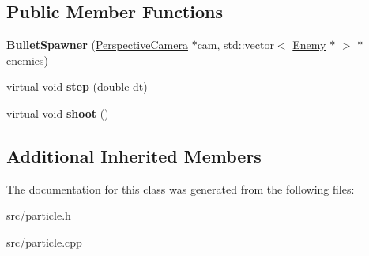 \subsection*{Public Member Functions}
\begin{DoxyCompactItemize}
\item 
\hypertarget{class_bullet_spawner_ae70bcc7f68643cc7c16fa82a864ad372}{}{\bfseries Bullet\+Spawner} (\hyperlink{class_perspective_camera}{Perspective\+Camera} $\ast$cam, std\+::vector$<$ \hyperlink{class_enemy}{Enemy} $\ast$ $>$ $\ast$enemies)\label{class_bullet_spawner_ae70bcc7f68643cc7c16fa82a864ad372}

\item 
\hypertarget{class_bullet_spawner_a5474e1659e4ca43f59620d31d53ed3d9}{}virtual void {\bfseries step} (double dt)\label{class_bullet_spawner_a5474e1659e4ca43f59620d31d53ed3d9}

\item 
\hypertarget{class_bullet_spawner_a2ef82c18cb619b1a23073f87453804f5}{}virtual void {\bfseries shoot} ()\label{class_bullet_spawner_a2ef82c18cb619b1a23073f87453804f5}

\end{DoxyCompactItemize}
\subsection*{Additional Inherited Members}


The documentation for this class was generated from the following files\+:\begin{DoxyCompactItemize}
\item 
src/particle.\+h\item 
src/particle.\+cpp\end{DoxyCompactItemize}
